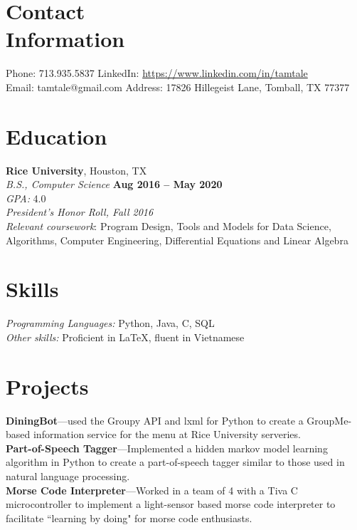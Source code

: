 \documentclass[margin,line]{resume}
\begin{document}
\begin{resume}
    \section{\mysidestyle Contact\\Information}

    Phone: 713.935.5837       \hfill LinkedIn: \url{https://www.linkedin.com/in/tamtale
} \\
    \noindent Email: tamtale@gmail.com  \hfill
    Address: 17826 Hillegeist Lane, Tomball, TX 77377

    \section{\mysidestyle Education}

    \textbf{Rice University}, Houston, TX \vspace{1mm}\\
    \textsl{B.S., Computer Science} \hfill \textbf{Aug 2016 -- May 2020} \vspace{1mm}\\
    \textsl{GPA: } 4.0 \vspace{1mm}\\
    \textsl{President's Honor Roll, Fall 2016} \vspace{1mm} \\
    \textsl{Relevant coursework}: Program Design, Tools and Models for Data Science, Algorithms, Computer Engineering, Differential Equations and Linear Algebra

    \section{\mysidestyle Skills}

    \emph{Programming Languages:} Python, Java, C, SQL \\
    \emph{Other skills:} Proficient in \LaTeX, fluent in Vietnamese

    \section{\mysidestyle Projects}

    \textbf{DiningBot}---used the Groupy API and lxml for Python to create a GroupMe-based information service for the menu at Rice University serveries.\vspace{1mm}\\
    \textbf{Part-of-Speech Tagger}---Implemented a hidden markov model learning algorithm in Python to create a part-of-speech tagger similar to those used in natural language processing.\vspace{1mm}\\
    \textbf{Morse Code Interpreter}---Worked in a team of 4 with a Tiva C microcontroller to implement a light-sensor based morse code interpreter to facilitate ``learning by doing" for morse code enthusiasts.


\end{resume}
\end{document}
